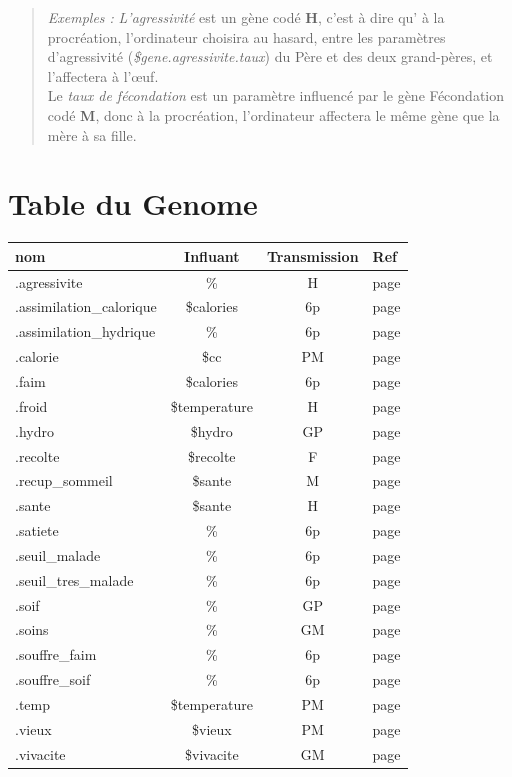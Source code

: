 \documentclass[french]{report}
\begin{document}
\begin{itemize}
	\begin{quote}
		\textit{Exemples : }
		\textit{L'agressivité} est un gène codé \textbf{H}, c'est à dire qu' à la procréation, l'ordinateur choisira au hasard, entre les paramètres d'agressivité (\textit{\$gene.agressivite.taux}) du Père et des deux grand-pères, et l'affectera à l’œuf.\\
		
		Le \textit{taux de fécondation} est un paramètre influencé par le gène Fécondation codé \textbf{M}, donc à la procréation, l'ordinateur affectera le même gène que la mère à sa fille.\\		
	\end{quote}
\end{itemize}
\section{Table du Genome}\label{liste_gene}
\begin{center}
\begin{tabular}{|l|c|c|l|}\hline
\rowcolor{green}\textbf{nom}  & \textbf{Influant} & \textbf{\small{Transmission}} & \textbf{Ref}\\ \hline

.agressivite & \% & H & page \pageref{agressivite} \\ \hline
.assimilation\_calorique & \$calories & 6p & page \pageref{nourrir} \\ \hline
.assimilation\_hydrique & \% & 6p & page \pageref{hydro} \\ \hline
.calorie & \$cc  & PM & page \pageref{cc} \\ \hline
.faim  & \$calories & 6p & page \pageref{faim} \\ \hline
.froid & \$temperature & H & page \pageref{froid} \\ \hline
.hydro & \$hydro & GP & page \pageref{hydro} \\ \hline
.recolte & \$recolte & F & page \pageref{param_action}\\ \hline
.recup\_sommeil & \$sante & M & page \pageref{sante}\\ \hline
.sante  & \$sante & H &  page \pageref{sante}\\ \hline
.satiete & \% & 6p & page \pageref{nourrir}\\ \hline
.seuil\_malade & \% & 6p & page \pageref{sante}\\ \hline
.seuil\_tres\_malade & \% & 6p & page \pageref{sante}\\ \hline
.soif & \% & GP & page \pageref{soif} \\ \hline
.soins & \% & GM & page \pageref{repos} \\ \hline
.souffre\_faim & \% & 6p & page \pageref{faim} \\ \hline
.souffre\_soif & \% & 6p & page \pageref{soif} \\ \hline
.temp & \$temperature & PM & page \pageref{temperature} \\ \hline
.vieux & \$vieux & PM & page \pageref{vieillesse} \\ \hline
.vivacite & \$vivacite & GM & page \pageref{vivacite} \\ \hline
\end{tabular}
\end{center}
\end{document}
